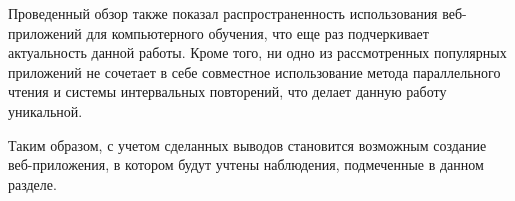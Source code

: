 Проведенный обзор также показал распространенность использования веб-приложений для компьютерного обучения, что еще раз подчеркивает актуальность данной работы. Кроме того, ни одно из рассмотренных популярных приложений не сочетает в себе совместное использование метода параллельного чтения и системы интервальных повторений, что делает данную работу уникальной.

Таким образом, с учетом сделанных выводов становится возможным создание веб-приложения, в котором будут учтены наблюдения, подмеченные в данном разделе.

